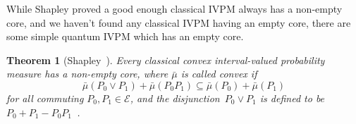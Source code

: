 \documentclass[english,reprint, aps, prl,superscriptaddress, showpacs,
showkeys]{revtex4-1}
\theoremstyle{plain}
\newtheorem{thm}{Theorem}
\theoremstyle{definition}
\newcommand{\events}{\ensuremath{\mathcal{E}}}
\begin{document}
While Shapley proved a good enough classical IVPM always has a non-empty
core, and we haven't found any classical IVPM having an empty core,
there are some simple quantum IVPM which has an empty core.

\begin{thm}[Shapley~\citep{Shapley1971,Grabisch2016}]\label{thm:Shapley}
Every classical convex interval-valued probability measure has a non-empty
core, where $\bar{\mu}$ is called convex if 
\begin{equation}
\bar{\mu}\left(P_{0}\vee P_{1}\right)+\bar{\mu}\left(P_{0}P_{1}\right)\subseteq\bar{\mu}\left(P_{0}\right)+\bar{\mu}\left(P_{1}\right)\label{eq:QuantumInterval-valuedProbability-Convex}
\end{equation}
for all commuting $P_{0},P_{1}\in\events$, and the \emph{disjunction}~$P_{0}\vee P_{1}$
is defined to be $P_{0}+P_{1}-P_{0}P_{1}$~\citep{Griffiths2003}.\end{thm}
\end{document}
